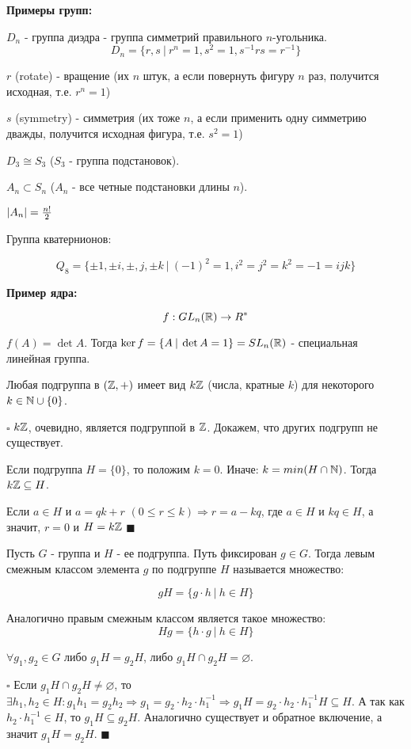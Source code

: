 \documentclass[../main.tex]{subfiles}
\begin{document}
\void
\textbf{Примеры групп:}

 $D_n$ - группа диэдра - группа симметрий правильного $n$-угольника.
$$D_n = \{r, s\:\vert\: r^n = 1, s^2 = 1, s^{-1}rs = r^{-1}\}$$

$r$ (rotate) - вращение (их $n$ штук, а если повернуть фигуру $n$ раз, получится исходная, т.е. $r^n = 1$)

$s$ (symmetry) - симметрия (их тоже $n$, а если применить одну симметрию дважды, получится исходная фигура, т.е. $s^2 = 1$)

 $D_3\cong S_3$ ($S_3$ - группа подстановок).

\void
{} $A_n\subset S_n $ ($A_n$ - все четные подстановки длины $n$).

$\vert A_n\vert = \frac{n!}{2}$

\void
{} Группа кватернионов:

$$Q_8 = \{\pm 1,\pm i,\pm, j,\pm k\:\vert\: (-1)^2 = 1, i^2 = j^2 = k^2 = -1 = ijk\}$$

\void
\textbf{Пример ядра:}

$$f: GL_n(\mathbb{R})\rightarrow R^*$$

$f(A) = \det{A}$. Тогда $\ker f = \{A\:\vert\: \det{A} = 1\} = SL_n(\mathbb{R})$ - специальная линейная группа.

\void
{} Любая подгруппа в $(\mathbb{Z}, +)$ имеет вид $k\mathbb{Z}$ (числа, кратные $k$) для некоторого $k\in \mathbb{N}\cup\{0\}$.

\void
$\square$ $k\mathbb{Z}$, очевидно, является подгруппой в $\mathbb{Z}$. Докажем, что других подгрупп не существует.

Если подгруппа $H = \{0\}$, то положим $k = 0$. Иначе: $k = min(H\cap\mathbb{N})$. Тогда $k\mathbb{Z}\subseteq H$.

Если $a\in H$ и $a = qk + r$ $(0\leqslant r\le k) \Rightarrow r = a - kq$, где $a\in H$ и $kq\in H$, а значит,
$r = 0$ и $H = k\mathbb{Z}$ $\blacksquare$

\void
{} Пусть $G$ - группа и $H$ - ее подгруппа. Путь фиксирован $g\in G$. Тогда левым смежным классом
элемента $g$ по подгруппе $H$ называется множество:

$$ gH = \{g\cdot h\:\vert\: h\in H\} $$

Аналогично правым смежным классом является такое множество:
$$ Hg = \{h\cdot g\:\vert\: h\in H\} $$

\void
{} $\forall g_1, g_2\in G$ либо $g_1H = g_2H$, либо $g_1H\cap g_2H = \varnothing$.

\void
$\square$ Если $g_1H\cap g_2H\neq\varnothing$, то $\exists h_1,h_2\in H: g_1h_1 = g_2h_2\Rightarrow
g_1 = g_2\cdot h_2\cdot h_1^{-1} \Rightarrow g_1H = g_2\cdot h_2\cdot h_1^{-1}H\subseteq H$.
А так как $h_2\cdot h_1^{-1}\in H$, то $g_1H\subseteq g_2H$. Аналогично существует
и обратное включение, а значит $g_1H = g_2H$. $\blacksquare$
\end{document}
